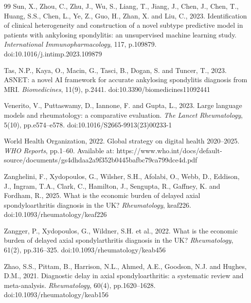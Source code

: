 \documentclass[12pt, a4paper]{article}
\renewcommand{\arraystretch}{0.9}  %
\renewcommand{\arraystretch}{1.0}  %
\begin{document}
\begin{thebibliography}{99}
Sun, X., Zhou, C., Zhu, J., Wu, S., Liang, T., Jiang, J., Chen, J., Chen, T., Huang, S.S., Chen, L., Ye, Z., Guo, H., Zhan, X. and Liu, C., 2023. Identification of clinical heterogeneity and construction of a novel subtype predictive model in patients with ankylosing spondylitis: an unsupervised machine learning study. \textit{International Immunopharmacology}, 117, p.109879. doi:10.1016/j.intimp.2023.109879

Tas, N.P., Kaya, O., Macin, G., Tasci, B., Dogan, S. and Tuncer, T., 2023. ASNET: a novel AI framework for accurate ankylosing spondylitis diagnosis from MRI. \textit{Biomedicines}, 11(9), p.2441. doi:10.3390/biomedicines11092441

Venerito, V., Puttaswamy, D., Iannone, F. and Gupta, L., 2023. Large language models and rheumatology: a comparative evaluation. \textit{The Lancet Rheumatology}, 5(10), pp.e574--e578. doi:10.1016/S2665-9913(23)00233-1

World Health Organization, 2022. Global strategy on digital health 2020--2025. \textit{WHO Reports}, pp.1--60. Available at: https://www.who.int/docs/default-source/documents/gs4dhdaa2a9f352b0445bafbc79ca799dce4d.pdf

Zanghelini, F., Xydopoulos, G., Wilsher, S.H., Afolabi, O., Webb, D., Eddison, J., Ingram, T.A., Clark, C., Hamilton, J., Sengupta, R., Gaffney, K. and Fordham, R., 2025. What is the economic burden of delayed axial spondyloarthritis diagnosis in the UK? \textit{Rheumatology}, keaf226. doi:10.1093/rheumatology/keaf226

Zangger, P., Xydopoulos, G., Wildner, S.H. et al., 2022. What is the economic burden of delayed axial spondylarthritis diagnosis in the UK? \textit{Rheumatology}, 61(2), pp.316--325. doi:10.1093/rheumatology/keab456

Zhao, S.S., Pittam, B., Harrison, N.L., Ahmed, A.E., Goodson, N.J. and Hughes, D.M., 2021. Diagnostic delay in axial spondyloarthritis: a systematic review and meta-analysis. \textit{Rheumatology}, 60(4), pp.1620--1628. doi:10.1093/rheumatology/keab156

\end{thebibliography}






\renewcommand{\arraystretch}{1.2} %
\end{document}

